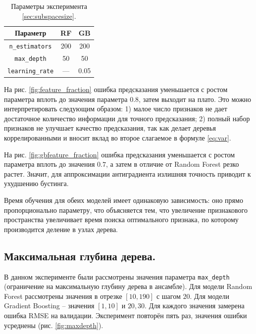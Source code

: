 \documentclass[12pt]{extarticle}
\begin{document}
\begin{table}
    \vspace{-5mm}
    \caption{Параметры эксперимента \ref{sec:subspacesize}.}
    \label{tbl:supspacesize}
    \begin{tabular}{c|c|c}
        Параметр & RF & GB \\
        \hline
        \texttt{n\_estimators} & 200 & 200\\
        \texttt{max\_depth} & 50 & 50\\
        \texttt{learning\_rate} & --- & 0.05\\
    \end{tabular}
\end{table} 

На рис. \ref{fig:feature_fraction} ошибка предсказания уменьшается с ростом параметра вплоть до значения параметра $0.8$, затем выходит на плато. Это можно интерпретировать следующим образом: 1) малое число признаков не дает достаточное количество информации для точного предсказания; 2) полный набор признаков не улучшает качество предсказания, так как делает деревья коррелированными и вносит вклад во второе слагаемое в формуле \eqref{eq:var}.

На рис. \ref{fig:gbfeature_fraction} ошибка предсказания уменьшается с ростом параметра вплоть до значения $0.7$, а затем в отличие от Random Forest резко растет. Значит, для аппроксимации антиградиента излишняя точность приводит к ухудшению бустинга.

Время обучения для обеих моделей имеет одинаковую зависимость: оно прямо пропорционально параметру, что объясняется тем, что увеличение признакового пространства увеличивает время поиска оптимального признака, по которому производится деление в узлах дерева. 

\subsection{Максимальная глубина дерева.} \label{sec:maxdepth}

В данном эксперименте были рассмотрены значения параметра \texttt{max\_depth} (ограничение на максимальную глубину дерева в ансамбле). Для модели Random Forest рассмотрены значения в отрезке $[10, 190]$ с шагом $20$. Для модели Gradient Boosting -- значения $[1,10]$ и $20,30$. Для каждого значения замерена ошибка RMSE на валидации. Эксперимент повторён пять раз, значения ошибки усреднены (рис. \ref{fig:maxdepth}).
\end{document}
